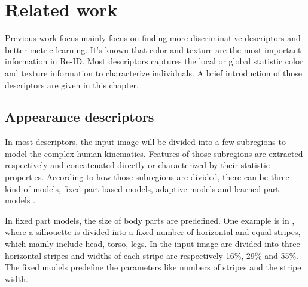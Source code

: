 \chapter{Related work}
Previous work focus mainly focus on finding more discriminative descriptors and better metric learning. It's known that color and texture are the most important information in Re-ID. Most descriptors captures the local or global statistic color and texture information to characterize individuals. A brief introduction of those descriptors are given in this chapter.

\section{Appearance descriptors}
In most descriptors, the input image will be divided into a few subregions to model the complex human kinematics. Features of those subregions are extracted respectively and concatenated directly or characterized by their statistic properties. According to how those subregions are divided, there can be three kind of models, fixed-part based models, adaptive models and learned part models \cite{Appearancedesc}. 

In fixed part models, the size of body parts are predefined. One example is in \cite{ImportantFeatures, PRDC, REIDSVM}, where a silhouette is divided into a fixed number of horizontal and equal stripes, which mainly include head, torso, legs. In \cite{AppBasedREID} the input image are divided into three horizontal stripes and widths of each stripe are respectively 16\%, 29\% and 55\%.  The fixed models predefine the parameters like numbers of stripes and the stripe width. 

